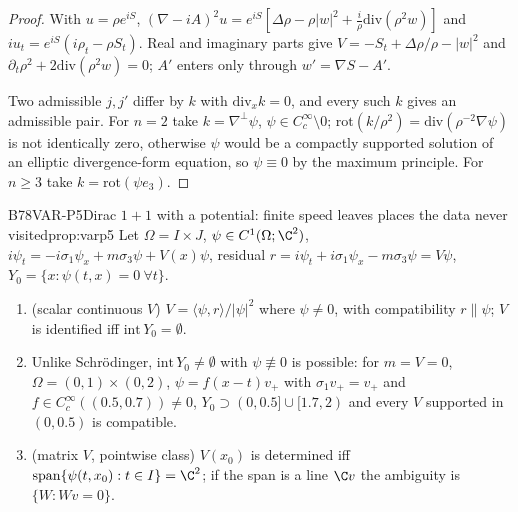 \begin{proof}
With $u=\rho e^{iS}$, $(\nabla-iA)^2u=e^{iS}[\Delta\rho-\rho|w|^2+\frac i\rho\mathrm{div}(\rho^2w)]$ and $iu_t=e^{iS}(i\rho_t-\rho S_t)$. Real and imaginary parts give $V=-S_t+\Delta\rho/\rho-|w|^2$ and $\partial_t\rho^2+2\mathrm{div}(\rho^2w)=0$; $A'$ enters only through $w'=\nabla S-A'$.

Two admissible $j,j'$ differ by $k$ with $\mathrm{div}_xk=0$, and every such $k$ gives an admissible pair. For $n=2$ take $k=\nabla^\perp\psi$, $\psi\in C_c^\infty\setminus0$; $\mathrm{rot}(k/\rho^2)=\mathrm{div}(\rho^{-2}\nabla\psi)$ is not identically zero, otherwise $\psi$ would be a compactly supported solution of an elliptic divergence-form equation, so $\psi\equiv0$ by the maximum principle. For $n\ge3$ take $k=\mathrm{rot}(\psi e_3)$.

\end{proof}

\begin{dimcard}{B78}{VAR-P5}{Dirac $1+1$ with a potential: finite speed leaves places the data never visited}{\proved}{prop:varp5}
Let $\Omega=I\times J$, $\psi\in C^1(\Omega;\C^2)$, $i\psi_t=-i\sigma_1\psi_x+m\sigma_3\psi+V(x)\psi$, residual $r=i\psi_t+i\sigma_1\psi_x-m\sigma_3\psi=V\psi$, $Y_0=\{x:\psi(t,x)=0\ \forall t\}$.
\begin{enumerate}[label=(\alph*)]
\item (scalar continuous $V$) $V=\langle\psi,r\rangle/|\psi|^2$ where $\psi\ne0$, with compatibility $r\parallel\psi$; $V$ is identified iff $\mathrm{int}\,Y_0=\emptyset$.
\item Unlike Schr\"odinger, $\mathrm{int}\,Y_0\ne\emptyset$ with $\psi\not\equiv0$ is possible: for $m=V=0$, $\Omega=(0,1)\times(0,2)$, $\psi=f(x-t)v_+$ with $\sigma_1v_+=v_+$ and $f\in C_c^\infty((0.5,0.7))\ne0$, $Y_0\supset(0,0.5]\cup[1.7,2)$ and every $V$ supported in $(0,0.5)$ is compatible.
\item (matrix $V$, pointwise class) $V(x_0)$ is determined iff $\mathrm{span}\{\psi(t,x_0):t\in I\}=\C^2$; if the span is a line $\C v$ the ambiguity is $\{W:Wv=0\}$.
\end{enumerate}
\end{dimcard}


